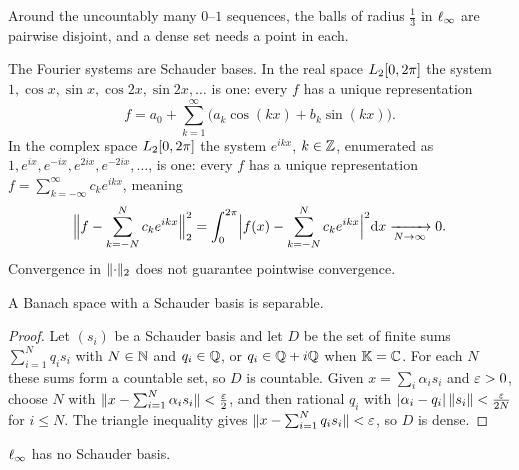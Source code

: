 \begin{nfigure}{Around the uncountably many $0$--$1$ sequences, the balls of
radius $\frac{1}{3}$ in $\ell_{\infty}$ are pairwise disjoint, and a dense set
needs a point in each.}
\end{nfigure}

\begin{example}\label{ex:fourier}
The Fourier systems are Schauder bases. In the real space $L_{2}[0,2\pi]$ the
system $1, \cos x, \sin x, \cos 2x, \sin 2x, \dots$ is one: every $f$ has a
unique representation
\[
  f = a_0 + \sum_{k=1}^{\infty} \bigl(a_k \cos(kx) + b_k \sin(kx)\bigr).
\]
In the complex space $L_{2}[0,2\pi]$ the system $e^{ikx}$, $k \in \mathbb{Z}$,
enumerated as $1, e^{ix}, e^{-ix}, e^{2ix}, e^{-2ix}, \dots$, is one: every
$f$ has a unique representation $f = \sum_{k=-\infty}^{\infty} c_k e^{ikx}$,
meaning
\[
  \Bigl\lVert f - \sum_{k=-N}^{N} c_k e^{ikx} \Bigr\rVert_2^2
  = \int_0^{2\pi} \Bigl\lvert f(x) - \sum_{k=-N}^{N} c_k e^{ikx}
    \Bigr\rvert^2 \mathrm{d} x
  \xrightarrow[N \to \infty]{} 0 .
\]
Convergence in $\lVert\cdot\rVert_2$ does not guarantee pointwise convergence.
\end{example}

\begin{proposition}\label{prop:schauder-sep}
A Banach space with a Schauder basis is separable.
\end{proposition}

\begin{proof}
Let $(s_i)$ be a Schauder basis and let $D$ be the set of finite sums
$\sum_{i=1}^{N} q_i s_i$ with $N \in \mathbb{N}$ and $q_i \in \mathbb{Q}$, or
$q_i \in \mathbb{Q} + i\mathbb{Q}$ when $\mathbb{K} = \mathbb{C}$. For each $N$ these sums form a countable
set, so $D$ is countable. Given $x = \sum_i \alpha_i s_i$ and $\varepsilon > 0$,
choose $N$ with $\lVert x - \sum_{i=1}^{N} \alpha_i s_i\rVert < \frac{\varepsilon}{2}$, and
then rational $q_i$ with
$\lvert\alpha_i - q_i\rvert\,\lVert s_i\rVert < \frac{\varepsilon}{2N}$ for $i \le N$. The
triangle inequality gives $\lVert x - \sum_{i=1}^{N} q_i s_i\rVert < \varepsilon$, so $D$
is dense.
\end{proof}

\begin{corollary}\label{cor:linfty-no-schauder}
$\ell_{\infty}$ has no Schauder basis.
\end{corollary}

